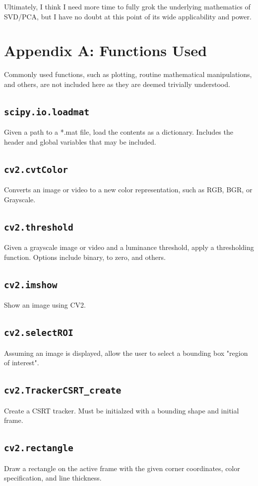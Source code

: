 \documentclass[journal]{IEEEtran}
\def\code#1{\texttt{#1}}
\begin{document}
Ultimately, I think I need more time to fully grok the underlying mathematics of SVD/PCA, but I
have no doubt at this point of its wide applicability and power.


\newpage
\clearpage
\newpage
\section{Appendix A: Functions Used}
Commonly used functions, such as plotting, routine mathematical manipulations, and others, are
not included here as they are deemed trivially understood.

\subsection{\code{scipy.io.loadmat}}
Given a path to a *.mat file, load the contents as a dictionary. Includes the header and global
variables that may be included.

\subsection{\code{cv2.cvtColor}}
Converts an image or video to a new color representation, such as RGB, BGR, or Grayscale.
\subsection{\code{cv2.threshold}}
Given a grayscale image or video and a luminance threshold, apply a thresholding function.
Options include binary, to zero, and others.
\subsection{\code{cv2.imshow}}
Show an image using CV2.
\subsection{\code{cv2.selectROI}}
Assuming an image is displayed, allow the user to select a bounding box "region of interest".
\subsection{\code{cv2.TrackerCSRT\_create}}
Create a CSRT tracker. Must be initialzed with a bounding shape and initial frame.
\subsection{\code{cv2.rectangle}}
Draw a rectangle on the active frame with the given corner coordinates, color specification,
and line thickness.
\end{document}
